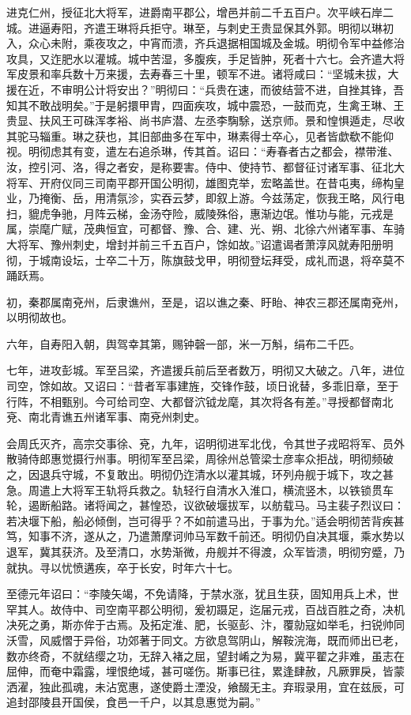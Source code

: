 \documentclass[]{article}
\begin{document}
进克仁州，授征北大将军，进爵南平郡公，增邑并前二千五百户。次平峡石岸二城。进逼寿阳，齐遣王琳将兵拒守。琳至，与刺史王贵显保其外郭。明彻以琳初入，众心未附，乘夜攻之，中宵而溃，齐兵退据相国城及金城。明彻令军中益修治攻具，又迮肥水以灌城。城中苦湿，多腹疾，手足皆肿，死者十六七。会齐遣大将军皮景和率兵数十万来援，去寿春三十里，顿军不进。诸将咸曰：``坚城未拔，大援在近，不审明公计将安出？''明彻曰：``兵贵在速，而彼结营不进，自挫其锋，吾知其不敢战明矣。''于是躬擐甲胄，四面疾攻，城中震恐，一鼓而克，生禽王琳、王贵显、扶风王可硃浑孝裕、尚书庐潜、左丞李騊駼，送京师。景和惶惧遁走，尽收其驼马辎重。琳之获也，其旧部曲多在军中，琳素得士卒心，见者皆歔欷不能仰视。明彻虑其有变，遣左右追杀琳，传其首。诏曰：``寿春者古之都会，襟带淮、汝，控引河、洛，得之者安，是称要害。侍中、使持节、都督征讨诸军事、征北大将军、开府仪同三司南平郡开国公明彻，雄图克举，宏略盖世。在昔屯夷，缔构皇业，乃掩衡、岳，用清氛沴，实吞云梦，即叙上游。今兹荡定，恢我王略，风行电扫，貔虎争驰，月阵云梯，金汤夺险，威陵殊俗，惠渐边氓。惟功与能，元戎是属，崇麾广赋，茂典恒宜，可都督、豫、合、建、光、朔、北徐六州诸军事、车骑大将军、豫州刺史，增封并前三千五百户，馀如故。''诏遣谒者萧淳风就寿阳册明彻，于城南设坛，士卒二十万，陈旗鼓戈甲，明彻登坛拜受，成礼而退，将卒莫不踊跃焉。

初，秦郡属南兗州，后隶谯州，至是，诏以谯之秦、盱眙、神农三郡还属南兗州，以明彻故也。

六年，自寿阳入朝，舆驾幸其第，赐钟磬一部，米一万斛，绢布二千匹。

七年，进攻彭城。军至吕梁，齐遣援兵前后至者数万，明彻又大破之。八年，进位司空，馀如故。又诏曰：``昔者军事建旌，交锋作鼓，顷日讹替，多乖旧章，至于行阵，不相甄别。今可给司空、大都督泬钺龙麾，其次将各有差。''寻授都督南北兗、南北青谯五州诸军事、南兗州刺史。

会周氏灭齐，高宗交事徐、兗，九年，诏明彻进军北伐，令其世子戎昭将军、员外散骑侍郎惠觉摄行州事。明彻军至吕梁，周徐州总管梁士彦率众拒战，明彻频破之，因退兵守城，不复敢出。明彻仍迮清水以灌其城，环列舟舰于城下，攻之甚急。周遣上大将军王轨将兵救之。轨轻行自清水入淮口，横流竖木，以铁锁贯车轮，遏断船路。诸将闻之，甚惶恐，议欲破堰拔军，以舫载马。马主裴子烈议曰：若决堰下船，船必倾倒，岂可得乎？不如前遣马出，于事为允。''适会明彻苦背疾甚笃，知事不济，遂从之，乃遣萧摩诃帅马军数千前还。明彻仍自决其堰，乘水势以退军，冀其获济。及至清口，水势渐微，舟舰并不得渡，众军皆溃，明彻穷蹙，乃就执。寻以忧愤遘疾，卒于长安，时年六十七。

至德元年诏曰：``李陵矢竭，不免请降，于禁水涨，犹且生获，固知用兵上术，世罕其人。故侍中、司空南平郡公明彻，爰初蹑足，迄届元戎，百战百胜之奇，决机决死之勇，斯亦侔于古焉。及拓定淮、肥，长驱彭、汴，覆勍寇如举毛，扫锐帅同沃雪，风威慴于异俗，功郊著于同文。方欲息驾阴山，解鞍浣海，既而师出已老，数亦终奇，不就结缨之功，无辞入褚之屈，望封崤之为易，冀平翟之非难，虽志在屈伸，而奄中霜露，埋恨绝域，甚可嗟伤。斯事已往，累逢肆赦，凡厥罪戾，皆蒙洒濯，独此孤魂，未沾宽惠，遂使爵土湮没，飨醊无主。弃瑕录用，宜在兹辰，可追封邵陵县开国侯，食邑一千户，以其息惠觉为嗣。''
\end{document}
